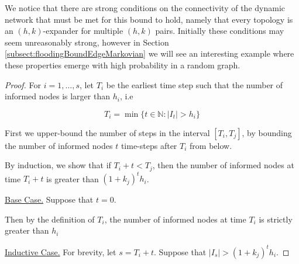 
We notice that there are strong conditions on the connectivity of the dynamic network that must be met for this bound to hold, namely that every topology is an $(h,k)$-expander for multiple $(h, k)$ pairs. Initially these conditions may seem unreasonably strong, however in Section \ref{subsect:floodingBoundEdgeMarkovian} we will see an interesting example where these properties emerge with high probability in a random graph.

\begin{proof}
	For $i = 1,\dots, s$, let $T_i$ be the earliest time step such that the number of informed nodes is larger than $h_i$, i.e

	$$
		T_i = \min \{ t \in \mathbb{N} : |I_t| > h_i \}
	$$

	First we upper-bound the number of steps in the interval $[T_i, T_j]$, %
	by bounding the number of informed nodes $t$ time-steps after $T_i$ from below.

	By induction, we show that if $T_i + t < T_j$, then the number of informed nodes at time $T_i + t$ is greater than $(1+k_j)^t h_i$.
	
	\underline{Base Case.} Suppose that $t=0$. 
	
	Then by the definition of $T_i$, the number of informed nodes at time $T_i$ is strictly greater than $h_i$

	\underline{Inductive Case.} For brevity, let $s = T_i + t$. Suppose that $|I_s| > (1+k_j)^t h_i$.


\end{proof}

